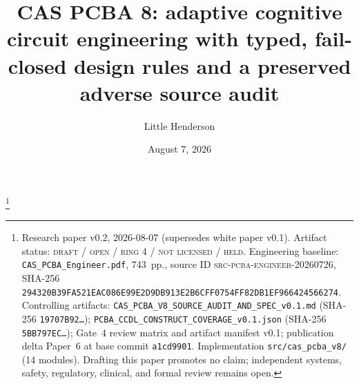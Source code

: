 \documentclass[11pt]{amsart}
\theoremstyle{definition}
\theoremstyle{remark}
\begin{document}
\title[CAS PCBA 8: adaptive cognitive circuit engineering]{CAS PCBA 8: adaptive cognitive circuit engineering with typed, fail-closed design rules and a preserved adverse source audit}
\author{Little Henderson}
\thanks{Research paper v0.2, 2026-08-07 (supersedes white paper v0.1). Artifact status: \textsc{draft / open / ring 4 / not licensed / held}. Engineering baseline: \texttt{CAS\_PCBA\_Engineer.pdf}, 743~pp., source ID \textsc{src-pcba-engineer-20260726}, SHA-256 \texttt{294320B39FA521EAC086E99E2D9DB913E2B6CFF0754FF82DB1EF966424566274}. Controlling artifacts: \texttt{CAS\_PCBA\_V8\_SOURCE\_AUDIT\_AND\_SPEC\_v0.1.md} (SHA-256 \texttt{19707B92\ldots}); \texttt{PCBA\_CCDL\_CONSTRUCT\_COVERAGE\_v0.1.json} (SHA-256 \texttt{5BB797EC\ldots}); Gate~4 review matrix and artifact manifest v0.1; publication delta Paper~6 at base commit \texttt{a1cd9901}. Implementation \texttt{src/cas\_pcba\_v8/} (14 modules). Drafting this paper promotes no claim; independent systems, safety, regulatory, clinical, and formal review remains open.}
\date{August 7, 2026}
\end{document}
